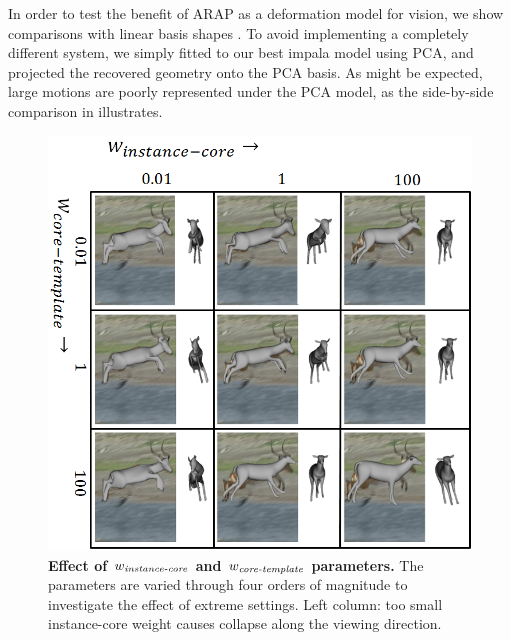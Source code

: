 \documentclass[preprint]{acmsiggraph}
\begin{document}
In order to test the benefit of ARAP as a deformation model for vision, we show comparisons with linear basis shapes \cite{Bregler:2000:RNR,Cashman:2012:WSA}.  To avoid implementing a completely different system, we simply fitted to our best impala model using PCA, and projected the recovered geometry onto the PCA basis.   As might be expected, large motions are poorly represented under the PCA model, as the side-by-side comparison in  illustrates. 



\begin{figure}[t]
\begin{center}
\vspace{-3mm}
\hspace{-10pt}\includegraphics[width=1.03\linewidth]{figures/3x3_parameter_settings_annotated.png}
\end{center}
\caption{\textbf{Effect of $w_{\text{\em instance-core}}$ and $w_{\text{\em core-template}}$ parameters.}  The parameters are varied through four orders of magnitude to investigate the effect of extreme settings. Left column: too small instance-core weight causes collapse along the viewing direction.}
\label{fig:parametergrid}
\end{figure}
\end{document}
